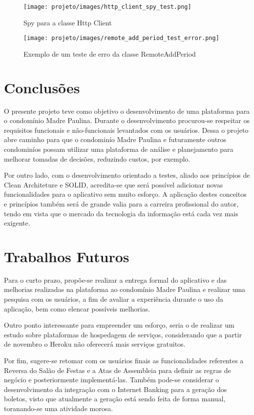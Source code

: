 \documentclass[12pt]{article}
\begin{document}
\begin{figure}[!ht]
  \centering
  \texttt{[image: projeto/images/http\_client\_spy\_test.png]}
  \caption{Spy para a classe Http Client}
  \label{fig:httpClientSpy}
\end{figure}

\begin{figure}[!ht]
  \centering
  \texttt{[image: projeto/images/remote\_add\_period\_test\_error.png]}
  \caption{Exemplo de um teste de erro da classe RemoteAddPeriod}
  \label{fig:remote_add_period_test_error}
\end{figure}

\section{Conclusões}
O presente projeto teve como objetivo o desenvolvimento de uma plataforma para o condomínio Madre Paulina. Durante o desenvolvimento procurou-se respeitar os requisitos funcionais e não-funcionais levantados com os usuários. Dessa o projeto abre caminho para que o condominío Madre Paulina e futuramente outros condominíos possam utilizar uma plataforma de análise e planejamento para melhorar tomadas de decisões, reduzindo custos, por exemplo.

Por outro lado, com o desenvolvimento orientado a testes, aliado aos princípios de Clean Architeture e SOLID, acredita-se que será possível adicionar novas funcionalidades para o aplicativo sem muito esforço. A aplicação destes conceitos e princípios também será de grande valia para a carreira profissional do autor, tendo em vista que o mercado da tecnologia da informação está cada vez mais exigente.

\section{Trabalhos Futuros}
Para o curto prazo, propõe-se realizar a entrega formal do aplicativo e das melhorias realizadas na plataforma ao condomínio Madre Paulina e realizar uma pesquisa com os usuários, a fim de avaliar a experiência durante o uso da aplicação, bem como elencar possíveis melhorias.

Outro ponto interessante para empreender um esforço, seria o de realizar um estudo sobre plataformas de hospedagem de serviços, considerando que a partir de novembro o Heroku não oferecerá mais serviços gratuitos. 

Por fim, sugere-se retomar com os usuários finais as funcionalidades referentes a Reversa do Salão de Festas e a Atas de Assembleia para definir as regras de negócio e posteriormente implementá-las. Também pode-se considerar o desenvolvimento da integração com o Internet Banking para a geração dos boletos, visto que atualmente a geração está sendo feita de forma manual, toranando-se uma atividade morosa.
\end{document}
